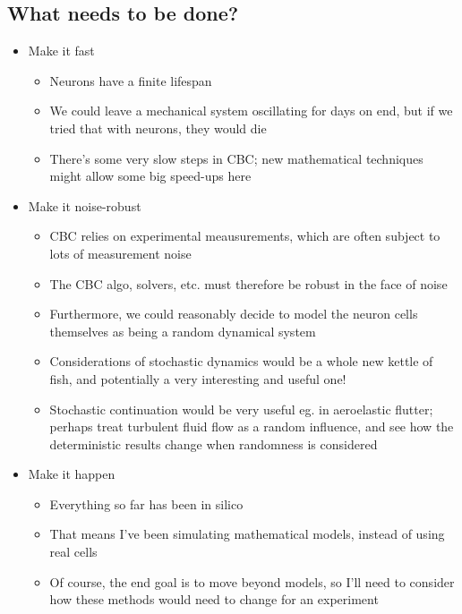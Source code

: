 \documentclass[11pt]{article}
\begin{document}
\subsection{What needs to be done?}
\label{sec:org4db8c52}
\begin{itemize}
\item Make it fast
\begin{itemize}
\item Neurons have a finite lifespan
\item We could leave a mechanical system oscillating for days on end, but if we tried that with neurons, they would die
\item There's some very slow steps in CBC; new mathematical techniques might allow some big speed-ups here
\end{itemize}

\item Make it noise-robust
\begin{itemize}
\item CBC relies on experimental meausurements, which are often subject to lots of measurement noise
\item The CBC algo, solvers, etc. must therefore be robust in the face of noise
\item Furthermore, we could reasonably decide to model the neuron cells themselves as being a random dynamical system
\item Considerations of stochastic dynamics would be a whole new kettle of fish, and potentially a very interesting and useful one!
\item Stochastic continuation would be very useful eg. in aeroelastic flutter; perhaps treat turbulent fluid flow as a random influence, and see how the deterministic results change when randomness is considered
\end{itemize}

\item Make it happen
\begin{itemize}
\item Everything so far has been in silico
\item That means I've been simulating mathematical models, instead of using real cells
\item Of course, the end goal is to move beyond models, so I'll need to consider how these methods would need to change for an experiment
\end{itemize}
\end{itemize}
\end{document}
